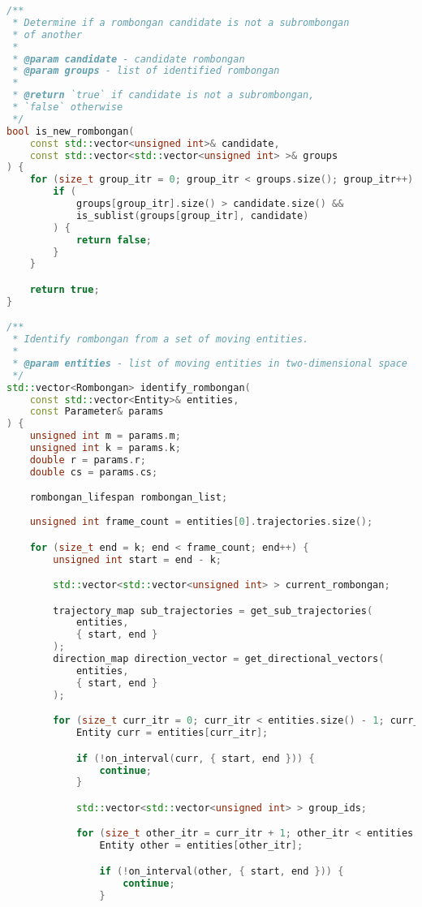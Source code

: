 \begin{lstlisting}[language=C++, caption=Implementasi modul \texttt{rombongan.cpp}, label={lamp:module-rombongan}]
/**
 * Determine if a rombongan candidate is not a subrombongan
 * of another
 * 
 * @param candidate - candidate rombongan
 * @param groups - list of identified rombongan
 * 
 * @return `true` if candidate is not a subrombongan,
 * `false` otherwise
 */
bool is_new_rombongan(
    const std::vector<unsigned int>& candidate,
    const std::vector<std::vector<unsigned int> >& groups
) {
    for (size_t group_itr = 0; group_itr < groups.size(); group_itr++) {
        if (
            groups[group_itr].size() > candidate.size() &&
            is_sublist(groups[group_itr], candidate)
        ) {
            return false;
        }
    }

    return true;
}

/**
 * Identify rombongan from a set of moving entities.
 * 
 * @param entities - list of moving entities in two-dimensional space
 */
std::vector<Rombongan> identify_rombongan(
    const std::vector<Entity>& entities,
    const Parameter& params
) {
    unsigned int m = params.m;
    unsigned int k = params.k;
    double r = params.r;
    double cs = params.cs;

    rombongan_lifespan rombongan_list;
    
    unsigned int frame_count = entities[0].trajectories.size();

    for (size_t end = k; end < frame_count; end++) {
        unsigned int start = end - k;

        std::vector<std::vector<unsigned int> > current_rombongan;

        trajectory_map sub_trajectories = get_sub_trajectories(
            entities,
            { start, end }
        );
        direction_map direction_vector = get_directional_vectors(
            entities,
            { start, end }
        );

        for (size_t curr_itr = 0; curr_itr < entities.size() - 1; curr_itr++) {
            Entity curr = entities[curr_itr];

            if (!on_interval(curr, { start, end })) {
                continue;
            }

            std::vector<std::vector<unsigned int> > group_ids;

            for (size_t other_itr = curr_itr + 1; other_itr < entities.size(); other_itr++) {
                Entity other = entities[other_itr];

                if (!on_interval(other, { start, end })) {
                    continue;
                }


\end{lstlisting}
